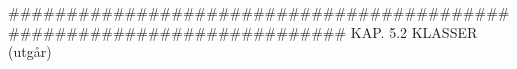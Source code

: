 ######################################################################## 
KAP. 5.2  KLASSER  (utgår)
